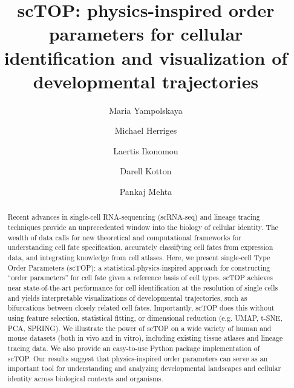 \documentclass[aps,superscriptaddress, notitlepage,longbibliography]{revtex4-1}
\begin{document}
\title{ scTOP: physics-inspired order parameters for cellular identification and visualization of developmental trajectories}

\author{Maria Yampolskaya}
\author{Michael Herriges}
\author{Laertis Ikonomou}
\author{Darell Kotton}


\author{Pankaj Mehta}


\begin{abstract}
Recent advances in single-cell RNA-sequencing (scRNA-seq) and lineage tracing techniques provide an unprecedented window into the biology of cellular identity. The wealth of data calls for new theoretical and computational frameworks for understanding cell fate specification, accurately classifying cell fates from expression data, and integrating knowledge from cell atlases. Here, we present single-cell Type Order Parameters (scTOP): a statistical-physics-inspired approach for constructing “order parameters” for cell fate given a reference basis of cell types.  scTOP achieves near state-of-the-art performance for cell identification at the resolution of single cells and yields interpretable visualizations of developmental trajectories, such as bifurcations between closely related cell fates. Importantly, scTOP does this without using feature selection, statistical fitting, or dimensional reduction (e.g. UMAP, t-SNE, PCA, SPRING). We illustrate the power of scTOP on a wide variety of human and mouse datasets (both in vivo and in vitro), including existing tissue atlases and lineage tracing data. We also provide an easy-to-use Python package implementation of scTOP. Our results suggest that physics-inspired order parameters can serve as an important tool for understanding and analyzing developmental landscapes and cellular identity across biological contexts and organisms.
\end{abstract}
\end{document}
